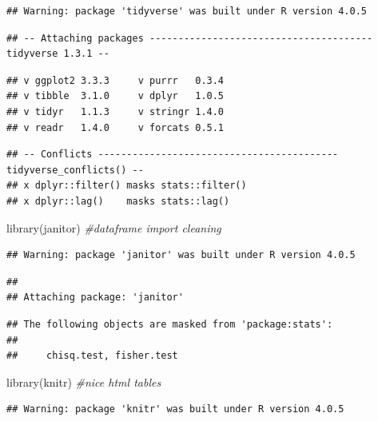 \documentclass[
]{article}
\newenvironment{Shaded}{\begin{snugshade}}{\end{snugshade}}
\newcommand{\CommentTok}[1]{\textcolor[rgb]{0.56,0.35,0.01}{\textit{#1}}}
\newcommand{\FunctionTok}[1]{\textcolor[rgb]{0.00,0.00,0.00}{#1}}
\newcommand{\NormalTok}[1]{#1}
\begin{document}
\begin{verbatim}
## Warning: package 'tidyverse' was built under R version 4.0.5
\end{verbatim}

\begin{verbatim}
## -- Attaching packages --------------------------------------- tidyverse 1.3.1 --
\end{verbatim}

\begin{verbatim}
## v ggplot2 3.3.3     v purrr   0.3.4
## v tibble  3.1.0     v dplyr   1.0.5
## v tidyr   1.1.3     v stringr 1.4.0
## v readr   1.4.0     v forcats 0.5.1
\end{verbatim}

\begin{verbatim}
## -- Conflicts ------------------------------------------ tidyverse_conflicts() --
## x dplyr::filter() masks stats::filter()
## x dplyr::lag()    masks stats::lag()
\end{verbatim}

\begin{Shaded}
\begin{Highlighting}[]
\FunctionTok{library}\NormalTok{(janitor) }\CommentTok{\#dataframe import cleaning}
\end{Highlighting}
\end{Shaded}

\begin{verbatim}
## Warning: package 'janitor' was built under R version 4.0.5
\end{verbatim}

\begin{verbatim}
## 
## Attaching package: 'janitor'
\end{verbatim}

\begin{verbatim}
## The following objects are masked from 'package:stats':
## 
##     chisq.test, fisher.test
\end{verbatim}

\begin{Shaded}
\begin{Highlighting}[]
\FunctionTok{library}\NormalTok{(knitr) }\CommentTok{\#nice html tables}
\end{Highlighting}
\end{Shaded}

\begin{verbatim}
## Warning: package 'knitr' was built under R version 4.0.5
\end{verbatim}
\end{document}
